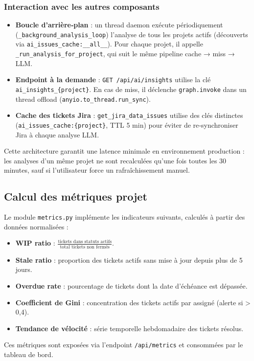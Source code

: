 \subsubsection*{Interaction avec les autres composants}

\begin{itemize}
    \renewcommand{\labelitemi}{—}
    \item \textbf{Boucle d’arrière‑plan} : un thread daemon exécute périodiquement (\texttt{\_background\_analysis\_loop}) l’analyse de tous les projets actifs (découverts via \texttt{ai\_issues\_cache:\_\_all\_\_}). Pour chaque projet, il appelle \texttt{\_run\_analysis\_for\_project}, qui suit le même pipeline cache → miss → LLM.
    \item \textbf{Endpoint à la demande} : \texttt{GET /api/ai/insights} utilise la clé \texttt{ai\_insights\_\{project\}}. En cas de miss, il déclenche \texttt{graph.invoke} dans un thread offload (\texttt{anyio.to\_thread.run\_sync}).
    \item \textbf{Cache des tickets Jira} : \texttt{get\_jira\_data\_issues} utilise des clés distinctes (\texttt{ai\_issues\_cache:\{project\}}, TTL 5 min) pour éviter de re‑synchroniser Jira à chaque analyse LLM.
\end{itemize}

Cette architecture garantit une latence minimale en environnement production : les analyses d’un même projet ne sont recalculées qu’une fois toutes les 30 minutes, sauf si l’utilisateur force un rafraîchissement manuel.

\subsection{Calcul des métriques projet}
Le module \texttt{metrics.py} implémente les indicateurs suivants, calculés à partir des données normalisées :
\begin{itemize}
    \renewcommand{\labelitemi}{—}
    \item \textbf{WIP ratio} : \( \frac{\text{tickets dans statuts actifs}}{\text{total tickets non fermés}} \).
    \item \textbf{Stale ratio} : proportion des tickets actifs sans mise à jour depuis plus de 5 jours.
    \item \textbf{Overdue rate} : pourcentage de tickets dont la date d’échéance est dépassée.
    \item \textbf{Coefficient de Gini} : concentration des tickets actifs par assigné (alerte si > 0,4).
    \item \textbf{Tendance de vélocité} : série temporelle hebdomadaire des tickets résolus.
\end{itemize}
Ces métriques sont exposées via l’endpoint \texttt{/api/metrics} et consommées par le tableau de bord.

